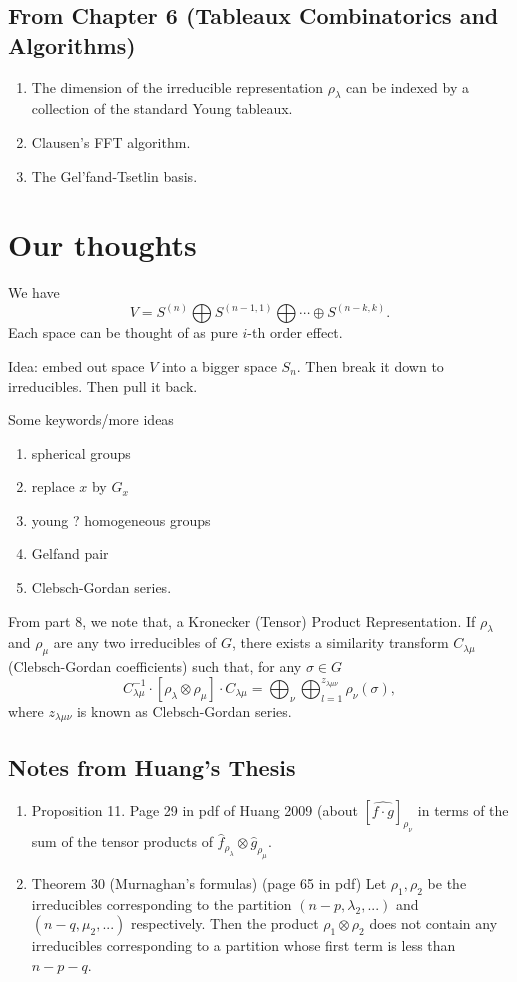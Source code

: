 \documentclass[10pt,reqno]{amsart}
\theoremstyle{definition}
\numberwithin{equation}{section}
\begin{document}
\subsection{From Chapter 6 (Tableaux Combinatorics
and Algorithms)}
\begin{enumerate}
\item  The dimension of the irreducible 
representation $\rho_\lambda$ can be 
indexed by a collection of the 
standard Young tableaux.
\item Clausen's FFT algorithm.
\item The Gel'fand-Tsetlin basis.
\end{enumerate}


\section{Our thoughts}
We have
\begin{equation}
V = S^{(n)}\bigoplus S^{(n-1, 1)} \bigoplus
\cdots \oplus S^{(n-k,k)}.
\end{equation}
Each space can be thought of as pure $i$-th
order effect.

Idea: embed out space $V$
into a bigger space $S_n$.
Then break it down to irreducibles.
Then pull it back.

Some keywords/more ideas
\begin{enumerate}
\item spherical groups
\item replace $x$ by $G_x$
\item young ? homogeneous groups
\item Gelfand pair
\item Clebsch-Gordan series.
\end{enumerate}

From part 8, we note that,
a Kronecker (Tensor) Product Representation.
If $\rho_\lambda$ and $\rho_\mu$ are any
two irreducibles of $G$, there exists a similarity
transform $C_{\lambda\mu}$ (Clebsch-Gordan coefficients) such that, for any
$\sigma\in G$
\[C_{\lambda\mu}^{-1}\cdot[\rho_\lambda\otimes\rho_\mu]
\cdot C_{\lambda\mu}
=
\bigoplus_{\nu}\bigoplus_{l=1}^{z_{\lambda\mu\nu}}
\rho_\nu(\sigma),
\]
where $z_{\lambda\mu\nu}$ is known 
as Clebsch-Gordan series.

\subsection{Notes from Huang's Thesis}
\begin{enumerate}
\item Proposition 11. Page 29 in pdf 
of Huang 2009 (about 
$[\widehat{f\cdot g}]_{\rho_\nu}$
in terms of the sum of the tensor products
of $\widehat{f}_{\rho_\lambda}\otimes \widehat{g}_{\rho_\mu}$.

\item 
\label{thm30}
Theorem 30 (Murnaghan's formulas)  (page 65 in pdf) Let $\rho_1,\rho_2$ be the irreducibles corresponding to the partition 
$(n - p, \lambda_2 ,...)$ and
$(n - q, \mu_2 ,...)$ respectively. Then the product
$\rho_1\otimes \rho_2$ does not contain any irreducibles corresponding to a partition whose first term is less than $n - p - q$.
\end{enumerate}
\end{document}
